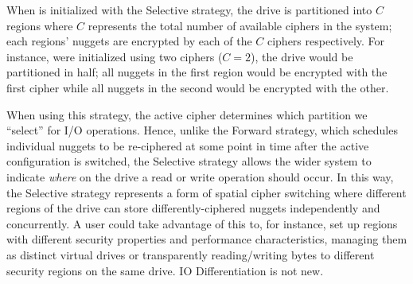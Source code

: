 When \sys is initialized with the Selective strategy, the drive is partitioned
into $C$ regions where $C$ represents the total number of available ciphers in
the system; each regions' nuggets are encrypted by each of the $C$ ciphers
respectively. For instance, were \sys initialized using two ciphers ($C = 2$),
the drive would be partitioned in half; all nuggets in the first region would be
encrypted with the first cipher while all nuggets in the second would be
encrypted with the other.

When using this strategy, the active cipher determines which partition we
``select'' for I/O operations. Hence, unlike the Forward strategy, which
schedules individual nuggets to be re-ciphered at some point in time after the
active configuration is switched, the Selective strategy allows the wider system
to indicate \emph{where} on the drive a read or write operation should occur. In
this way, the Selective strategy represents a form of spatial cipher switching
where different regions of the drive can store differently-ciphered nuggets
independently and concurrently. A user could take advantage of this to, for
instance, set up regions with different security properties and performance
characteristics, managing them as distinct virtual drives or transparently
reading/writing bytes to different security regions on the same drive. IO
Differentiation is not new.
